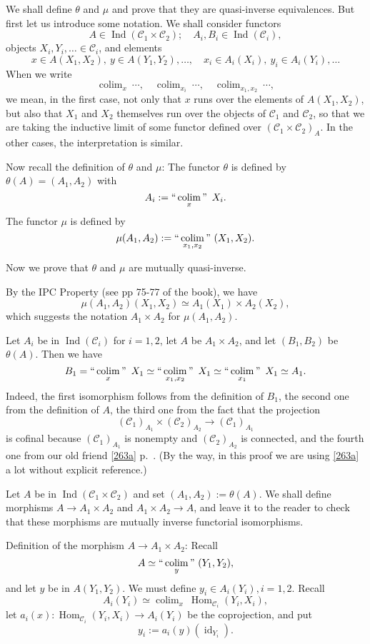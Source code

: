 \documentclass[12pt]{article}
\theoremstyle{remark}%
\newcommand{\C}{\mathcal C}
\DeclareMathOperator*{\coli}{colim}
\DeclareMathOperator*{\co}{colim}
\DeclareMathOperator*{\ic}{``\coli"}
\DeclareMathOperator{\id}{id}
\DeclareMathOperator{\h}{Hom}
\DeclareMathOperator{\Ind}{Ind}
\begin{document}
We shall define $\theta$ and $\mu$ and prove that they are quasi-inverse equivalences. But first let us introduce some notation. We shall consider functors 
$$
A\in\Ind(\C_1\times\C_2);\quad A_i,B_i\in\Ind(\C_i), 
$$ 
objects $X_i,Y_i,\dots\in\C_i$, and elements 
$$
x\in A(X_1,X_2),\ y\in A(Y_1,Y_2),\dots,\quad x_i\in A_i(X_i),\ y_i\in A_i(Y_i),\dots
$$ 
When we write 
$$
\co_x\ \cdots,\quad \co_{x_i}\ \cdots,\quad \co_{x_1,x_2}\ \cdots,
$$ 
we mean, in the first case, not only that $x$ runs over the elements of $A(X_1,X_2)$, but also that $X_1$ and $X_2$ themselves run over the objects of $\C_1$ and $\C_2$, so that we are taking the inductive limit of some functor defined over $(\C_1\times\C_2)_A$. In the other cases, the interpretation is similar. 

Now recall the definition of $\theta$ and $\mu$: The functor $\theta$ is defined by $\theta(A)=(A_1,A_2)$ with 
$$
A_i:=\ic_x\ X_i. 
$$ 
The functor $\mu$ is defined by 
$$
\mu(A_1,A_2):=\ic_{x_1,x_2}\ (X_1,X_2). 
$$ 

Now we prove that $\theta$ and $\mu$ are mutually quasi-inverse. 

By the IPC Property (see pp 75-77 of the book), we have 
$$
\mu(A_1,A_2)(X_1,X_2)\simeq A_1(X_1)\times A_2(X_2), 
$$ 
which suggests the notation $A_1\times A_2$ for $\mu(A_1,A_2)$. 

Let $A_i$ be in $\Ind(\C_i)$ for $i=1,2$, let $A$ be $A_1\times A_2$, and let $(B_1,B_2)$ be $\theta(A)$. Then we have 
$$ 
B_1=\ic_x\ X_1\simeq\ic_{x_1,x_2}\ X_1\simeq\ic_{x_1}\ X_1\simeq A_1.
$$ 
Indeed, the first isomorphism follows from the definition of $B_1$, the second one from the definition of $A$, the third one from the fact that the projection 
$$
(\C_1)_{A_1}\times (\C_2)_{A_2}\to(\C_1)_{A_1}
$$ 
is cofinal because $(\C_1)_{A_1}$ is nonempty and $(\C_2)_{A_2}$ is connected, and the fourth one from our old friend \eqref{263a} p.~\pageref{263a}. (By the way, in this proof we are using \eqref{263a} a lot without explicit reference.) 

Let $A$ be in $\Ind(\C_1\times\C_2)$ and set $(A_1,A_2):=\theta(A)$. We shall define morphisms $A\to A_1\times A_2$ and $A_1\times A_2\to A$, and leave it to the reader to check that these morphisms are mutually inverse functorial isomorphisms. 

Definition of the morphism $A\to A_1\times A_2$: Recall 
$$
A\simeq\ic_y\ (Y_1,Y_2), 
$$ 
and let $y$ be in $A(Y_1,Y_2)$. We must define $y_i\in A_i(Y_i),i=1,2$. Recall 
$$
A_i(Y_i)\simeq\co_x\ \h_{\C_i}(Y_i,X_i), 
$$ 
let $a_i(x):\h_{\C_i}(Y_i,X_i)\to A_i(Y_i)$ be the coprojection, and put 
$$
y_i:=a_i(y)(\id_{Y_i}). 
$$ 
\end{document}
